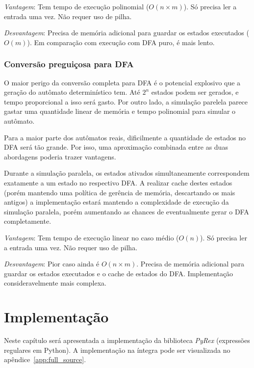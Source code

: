 \documentclass[a4paper,12pt,oneside,onecolumn]{uerj}
\begin{document}
\emph{Vantagem}: Tem tempo de execução polinomial ($O(n \times m)$). Só precisa ler a entrada uma vez. Não requer uso de pilha.

\emph{Desvantagem}: Precisa de memória adicional para guardar os estados executados ($O(m)$). Em comparação com execução com DFA puro, é mais lento.

\subsection{Conversão preguiçosa para DFA}

O maior perigo da conversão completa para DFA é o potencial explosivo que a geração do autômato determinístico tem. Até $2^n$ estados podem ser gerados, e tempo proporcional a isso será gasto. Por outro lado, a simulação parelela parece gastar uma quantidade linear de memória e tempo polinomial para simular o autômato.

Para a maior parte dos autômatos reais, dificilmente a quantidade de estados no DFA será tão grande. Por isso, uma aproximação combinada entre as duas abordagens poderia trazer vantagens.

Durante a simulação paralela, os estados ativados simultaneamente correspondem exatamente a um estado no respectivo DFA. A realizar cache destes estados (porém mantendo uma política de gerência de memória, descartando os mais antigos) a implementação estará mantendo a complexidade de execução da simulação paralela, porém aumentando as chances de eventualmente gerar o DFA completamente.

\emph{Vantagem}: Tem tempo de execução linear no caso médio ($O(n)$). Só precisa ler a entrada uma vez. Não requer uso de pilha.

\emph{Desvantagem}: Pior caso ainda é $O(n \times m)$. Precisa de memória adicional para guardar os estados executados e o cache de estados do DFA. Implementação consideravelmente mais complexa.

\chapter{Implementação}

Neste capítulo será apresentada a implementação da biblioteca \emph{PyRex} (expressões regulares em Python). A implementação na íntegra pode ser visualizada no apêndice~\ref{app:full_source}.
\end{document}
